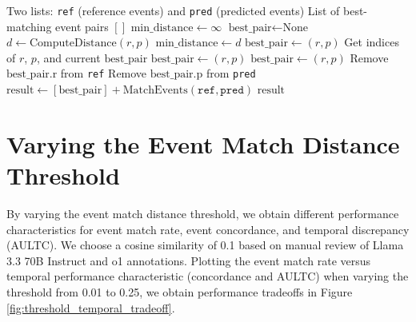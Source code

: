 \begin{algorithm}[ht]
\caption{Recursive Best Match}
\label{alg:recursive_match}
\begin{algorithmic}[1]
\Require Two lists: \texttt{ref} (reference events) and \texttt{pred} (predicted events)
\Ensure List of best-matching event pairs
        \State \Return $[]$
    \EndIf
    \State $\text{min\_distance} \gets \infty$
    \State $\text{best\_pair} \gets \text{None}$
            \State $d \gets \text{ComputeDistance}(r, p)$
                \State $\text{min\_distance} \gets d$
                \State $\text{best\_pair} \gets (r, p)$
                \State Get indices of $r$, $p$, and current $\text{best\_pair}$
                    \State $\text{best\_pair} \gets (r, p)$
                    \State $\text{best\_pair} \gets (r, p)$
                \EndIf
            \EndIf
        \EndFor
    \EndFor
    \State Remove $\text{best\_pair.r}$ from \texttt{ref}
    \State Remove $\text{best\_pair.p}$ from \texttt{pred}
    \State $\text{result} \gets [\text{best\_pair}] + \text{MatchEvents}(\texttt{ref}, \texttt{pred})$
    \State \Return $\text{result}$
\EndFunction
\end{algorithmic}
\end{algorithm}

\section{Varying the Event Match Distance Threshold}
\label{apd:choosing_match_threshold}

By varying the event match distance threshold, we obtain different performance characteristics for event match rate, event concordance, and temporal discrepancy (AULTC).  We choose a cosine similarity of 0.1 based on manual review of Llama 3.3 70B Instruct and o1 annotations.  Plotting the event match rate versus temporal performance characteristic (concordance and AULTC) when varying the threshold from 0.01 to 0.25, we obtain performance tradeoffs in Figure \ref{fig:threshold_temporal_tradeoff}.

